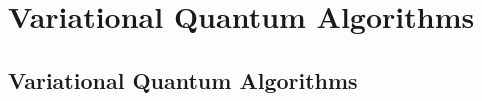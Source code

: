 \chapter{\label{ch:3-variational-quantum-algorithms}Variational Quantum Algorithms}

\section{Variational Quantum Algorithms}

